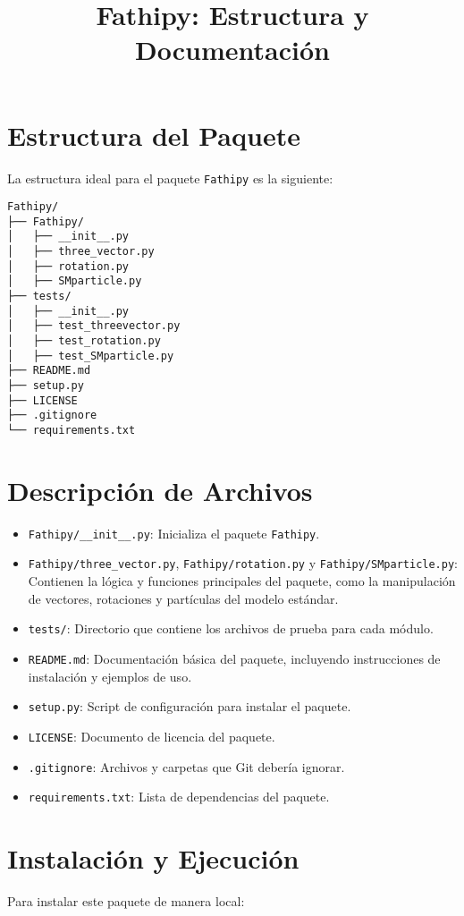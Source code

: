 \documentclass{article}
\title{Fathipy: Estructura y Documentación}
\begin{document}
\maketitle
\section{Estructura del Paquete}
La estructura ideal para el paquete \texttt{Fathipy} es la siguiente:

\begin{verbatim}
Fathipy/
├── Fathipy/
│   ├── __init__.py
│   ├── three_vector.py
│   ├── rotation.py
│   ├── SMparticle.py
├── tests/
│   ├── __init__.py
│   ├── test_threevector.py
│   ├── test_rotation.py
│   ├── test_SMparticle.py
├── README.md
├── setup.py
├── LICENSE
├── .gitignore
└── requirements.txt
\end{verbatim}

\section{Descripción de Archivos}
\begin{itemize}
    \item \texttt{Fathipy/\_\_init\_\_.py}: Inicializa el paquete \texttt{Fathipy}.
    \item \texttt{Fathipy/three_vector.py}, \texttt{Fathipy/rotation.py} y \texttt{Fathipy/SMparticle.py}: Contienen la lógica y funciones principales del paquete, como la manipulación de vectores, rotaciones y partículas del modelo estándar.
    \item \texttt{tests/}: Directorio que contiene los archivos de prueba para cada módulo.
    \item \texttt{README.md}: Documentación básica del paquete, incluyendo instrucciones de instalación y ejemplos de uso.
    \item \texttt{setup.py}: Script de configuración para instalar el paquete.
    \item \texttt{LICENSE}: Documento de licencia del paquete.
    \item \texttt{.gitignore}: Archivos y carpetas que Git debería ignorar.
    \item \texttt{requirements.txt}: Lista de dependencias del paquete.
\end{itemize}

\section{Instalación y Ejecución}
Para instalar este paquete de manera local:
\end{document}
